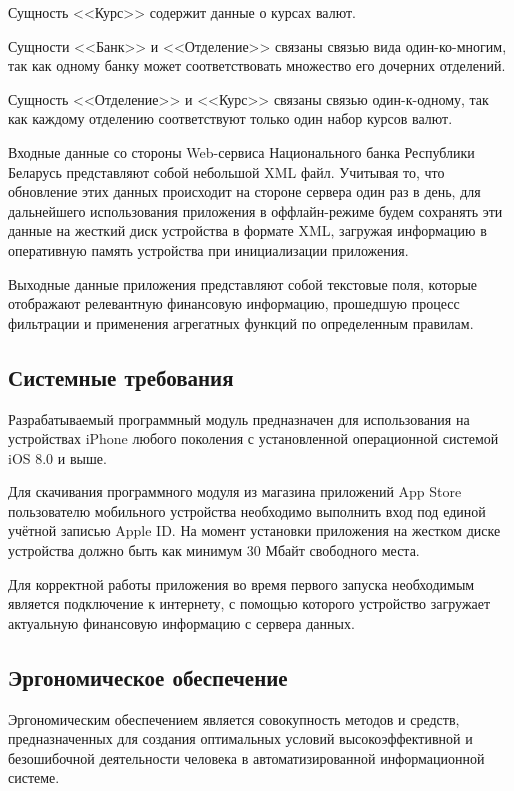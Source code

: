 Сущность <<Курс>> содержит данные о курсах валют.

Сущности <<Банк>> и <<Отделение>> связаны связью
вида один-ко-многим, так как одному банку может соответствовать
множество его дочерних отделений.

Сущность <<Отделение>> и <<Курс>> связаны связью один-к-одному,
так как каждому отделению соответствуют только один набор курсов валют.

Входные данные со стороны Web-сервиса Национального банка Республики Беларусь
представляют собой небольшой XML файл. Учитывая то, что обновление этих данных
происходит на стороне сервера один раз в день, для дальнейшего использования
приложения в оффлайн-режиме будем сохранять эти данные на жесткий
диск устройства в формате XML, загружая информацию в оперативную память
устройства при инициализации приложения.

Выходные данные приложения представляют собой текстовые поля, которые
отображают релевантную финансовую информацию, прошедшую процесс фильтрации
и применения агрегатных функций по определенным правилам.



\subsection{Системные требования}

Разрабатываемый программный модуль предназначен для использования на устройствах
iPhone любого поколения с установленной операционной системой iOS 8.0 и выше.

Для скачивания программного модуля из магазина приложений
App Store пользователю мобильного устройства необходимо выполнить
вход под единой учётной записью Apple ID. На момент установки приложения на
жестком диске устройства должно быть как минимум 30 Мбайт свободного места.

Для корректной работы приложения во время первого запуска необходимым является
подключение к интернету, с помощью которого устройство загружает актуальную
финансовую информацию с сервера данных.



\subsection{Эргономическое обеспечение}

Эргономическим обеспечением является совокупность методов и средств,
предназначенных для создания оптимальных условий высокоэффективной и
безошибочной деятельности человека в автоматизированной информационной системе.

